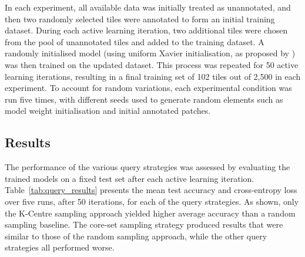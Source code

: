 In each experiment, all available data was initially treated as unannotated, and then two randomly selected tiles were annotated to form an initial training dataset. During each active learning iteration, two additional tiles were chosen from the pool of unannotated tiles and added to the training dataset. A randomly initialised model (using uniform Xavier initialisation, as proposed by \cite{glorot2010understanding}) was then trained on the updated dataset. This process was repeated for 50 active learning iterations, resulting in a final training set of 102 tiles out of 2,500 in each experiment. To account for random variations, each experimental condition was run five times, with different seeds used to generate random elements such as model weight initialisation and initial annotated patches.

\subsection{Results}
\label{subsec:active_results}
The performance of the various query strategies was assessed by evaluating the trained models on a fixed test set after each active learning iteration. Table~\ref{tab:query_results} presents the mean test accuracy and cross-entropy loss over five runs, after 50 iterations, for each of the query strategies. As shown, only the K-Centre sampling approach yielded higher average accuracy than a random sampling baseline. The core-set sampling strategy produced results that were similar to those of the random sampling approach, while the other query strategies all performed worse.

\begin{table}[b]
	\centering
	\caption{Test results for each query strategy after 50 active iterations. For Accuracy and Mean Class Accuracy higher is better and Loss lower is better.}
	\label{tab:query_results}
\end{table}

